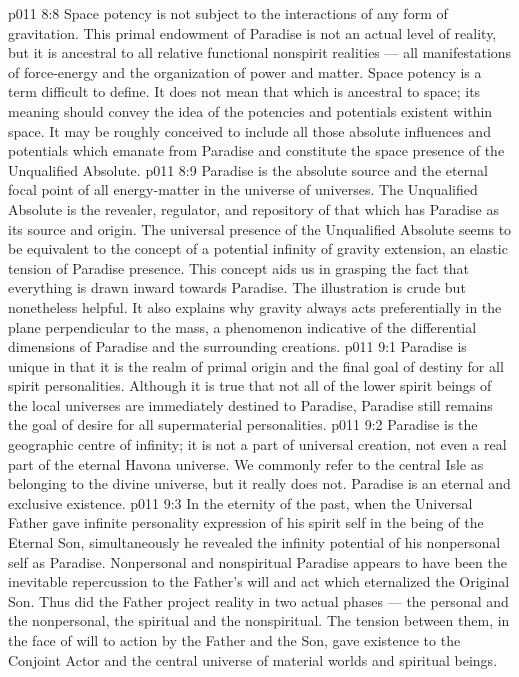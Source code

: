 \vs p011 8:8 \pc Space potency is not subject to the interactions of any form of gravitation. This primal endowment of Paradise is not an actual level of reality, but it is ancestral to all relative functional nonspirit realities --- all manifestations of force\hyp{}energy and the organization of power and matter. Space potency is a term difficult to define. It does not mean that which is ancestral to space; its meaning should convey the idea of the potencies and potentials existent within space. It may be roughly conceived to include all those absolute influences and potentials which emanate from Paradise and constitute the space presence of the Unqualified Absolute.
\vs p011 8:9 Paradise is the absolute source and the eternal focal point of all energy\hyp{}matter in the universe of universes. The Unqualified Absolute is the revealer, regulator, and repository of that which has Paradise as its source and origin. The universal presence of the Unqualified Absolute seems to be equivalent to the concept of a potential infinity of gravity extension, an elastic tension of Paradise presence. This concept aids us in grasping the fact that everything is drawn inward towards Paradise. The illustration is crude but nonetheless helpful. It also explains why gravity always acts preferentially in the plane perpendicular to the mass, a phenomenon indicative of the differential dimensions of Paradise and the surrounding creations.
\vs p011 9:1 Paradise is unique in that it is the realm of primal origin and the final goal of destiny for all spirit personalities. Although it is true that not all of the lower spirit beings of the local universes are immediately destined to Paradise, Paradise still remains the goal of desire for all supermaterial personalities.
\vs p011 9:2 \pc Paradise is the geographic centre of infinity; it is not a part of universal creation, not even a real part of the eternal Havona universe. We commonly refer to the central Isle as belonging to the divine universe, but it really does not. Paradise is an eternal and exclusive existence.
\vs p011 9:3 \pc In the eternity of the past, when the Universal Father gave infinite personality expression of his spirit self in the being of the Eternal Son, simultaneously he revealed the infinity potential of his nonpersonal self as Paradise. Nonpersonal and nonspiritual Paradise appears to have been the inevitable repercussion to the Father’s will and act which eternalized the Original Son. Thus did the Father project reality in two actual phases --- the personal and the nonpersonal, the spiritual and the nonspiritual. The tension between them, in the face of will to action by the Father and the Son, gave existence to the Conjoint Actor and the central universe of material worlds and spiritual beings.
